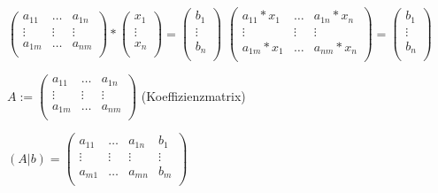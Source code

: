 \documentclass{../tudscript}
\begin{document}
\(\begin{pmatrix}  a_{11} & \dots & a_{1n} \\  \vdots &\vdots &\vdots \\  a_{1m} & \dots & a_{nm} \\ \end{pmatrix}*\begin{pmatrix}  x_{1} \\  \vdots \\  x_{n} \\ \end{pmatrix}=\begin{pmatrix}  b_{1} \\  \vdots \\  b_{n} \\ \end{pmatrix}\)
\(\begin{pmatrix}  a_{11} *x_1 & \dots & a_{1n}*x_n \\  \vdots &\vdots &\vdots \\  a_{1m} *x_1 & \dots & a_{nm}*x_n \\ \end{pmatrix}=\begin{pmatrix}  b_{1} \\  \vdots \\  b_{n} \\ \end{pmatrix}\)

\(A :=\begin{pmatrix}  a_{11} & \dots & a_{1n} \\  \vdots &\vdots &\vdots \\  a_{1m} & \dots & a_{nm} \\ \end{pmatrix}\)
(Koeffizienzmatrix)

\((A|b) = \left(\begin{array}{ccc|c}  a_{11} & \dots & a_{1n} & b_1 \\  \vdots & \vdots &\vdots &\vdots \\  a_{m1} & \dots & a_{mn} & b_m \\ \end{array}\right)\)

\hypertarget{bsp}{%
\label{bsp}}
\end{document}
